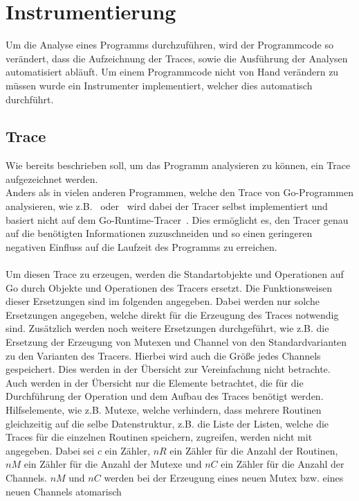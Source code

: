 \chapter{Instrumentierung}\label{Chap:Instrumenter}
Um die Analyse eines Programms durchzuführen, wird der Programmcode 
so verändert, dass die Aufzeichnung der Traces, sowie die Ausführung 
der Analysen automatisiert abläuft. Um einem Programmcode nicht von Hand 
verändern zu müssen wurde ein Instrumenter implementiert, welcher dies 
automatisch durchführt.

\section{Trace}\label{Chap:Instrumenter-Sec:Trace}
Wie bereits beschrieben soll, um das 
Programm analysieren zu können, ein Trace aufgezeichnet werden.\\
Anders als in vielen anderen Programmen, welche den Trace von Go-Programmen
analysieren, wie z.B.~\cite{GoAt2} oder~\cite{GoVis} wird dabei der Tracer 
selbst implementiert und basiert nicht auf dem Go-Runtime-Tracer~\cite{GoRunTrace}. 
Dies ermöglicht es, den Tracer genau auf die benötigten Informationen zuzuschneiden
und so einen geringeren negativen Einfluss auf die Laufzeit des Programms zu erreichen.\\\\
Um diesen Trace zu erzeugen, werden die Standartobjekte und Operationen auf Go durch Objekte und Operationen 
des Tracers ersetzt. Die Funktionsweisen dieser Ersetzungen sind im folgenden 
angegeben. Dabei werden nur solche Ersetzungen angegeben, welche direkt 
für die Erzeugung
des Traces notwendig sind. Zusätzlich werden noch 
weitere Ersetzungen durchgeführt, wie z.B. die Ersetzung der Erzeugung von 
Mutexen und Channel von den Standardvarianten zu den Varianten des Tracers.
Hierbei wird auch die Größe jedes Channels gespeichert.
Dies werden in der Übersicht zur Vereinfachung nicht betrachte. Auch werden 
in der Übersicht nur die Elemente betrachtet, die für die Durchführung der 
Operation und dem Aufbau des Traces benötigt werden. Hilfselemente, wie z.B. 
Mutexe, welche verhindern, dass mehrere Routinen gleichzeitig auf die selbe 
Datenstruktur, 
z.B. die Liste der Listen, welche die Traces für die einzelnen Routinen 
speichern, zugreifen, werden nicht mit angegeben. Dabei sei $c$ ein 
Zähler, $nR$ ein Zähler für die Anzahl der Routinen, $nM$ ein Zähler für die 
Anzahl der Mutexe und $nC$ ein Zähler für die Anzahl der Channels. $nM$ und $nC$
werden bei der Erzeugung eines neuen Mutex bzw. eines neuen Channels atomarisch 
